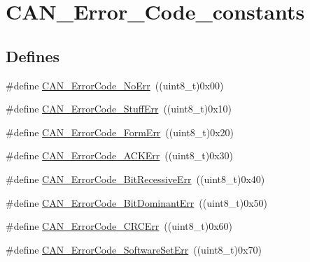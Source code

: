 \hypertarget{group__CAN__Error__Code__constants}{
\section{CAN\_\-Error\_\-Code\_\-constants}
\label{group__CAN__Error__Code__constants}
}
\subsection*{Defines}
\begin{DoxyCompactItemize}
\item 
\#define \hyperlink{group__CAN__Error__Code__constants_ga025d891e9c5cec2cfecb2213b4f74a9e}{CAN\_\-ErrorCode\_\-NoErr}~((uint8\_\-t)0x00)
\item 
\#define \hyperlink{group__CAN__Error__Code__constants_gaa733d1c078472912c3bf60fbdc53734d}{CAN\_\-ErrorCode\_\-StuffErr}~((uint8\_\-t)0x10)
\item 
\#define \hyperlink{group__CAN__Error__Code__constants_ga1fe585558bb8d5c834b4266661392cb2}{CAN\_\-ErrorCode\_\-FormErr}~((uint8\_\-t)0x20)
\item 
\#define \hyperlink{group__CAN__Error__Code__constants_gad47e6af0116d1b6de85e29286c0b8607}{CAN\_\-ErrorCode\_\-ACKErr}~((uint8\_\-t)0x30)
\item 
\#define \hyperlink{group__CAN__Error__Code__constants_gaf800de7683f1d22194e1df8eb3b1c5bb}{CAN\_\-ErrorCode\_\-BitRecessiveErr}~((uint8\_\-t)0x40)
\item 
\#define \hyperlink{group__CAN__Error__Code__constants_gaa19708aa85d1a34f8f7f25a2bfe88b19}{CAN\_\-ErrorCode\_\-BitDominantErr}~((uint8\_\-t)0x50)
\item 
\#define \hyperlink{group__CAN__Error__Code__constants_gafa75157442dba7ba1a91036242b78e92}{CAN\_\-ErrorCode\_\-CRCErr}~((uint8\_\-t)0x60)
\item 
\#define \hyperlink{group__CAN__Error__Code__constants_ga927089dd74347b9fea7a7c59f3840a7c}{CAN\_\-ErrorCode\_\-SoftwareSetErr}~((uint8\_\-t)0x70)
\end{DoxyCompactItemize}


